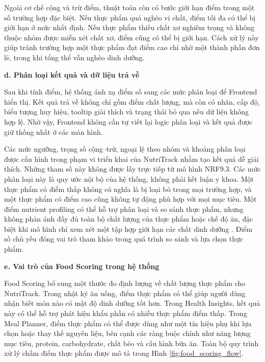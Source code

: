 \documentclass[12pt, a4paper]{report}
\begin{document}
Ngoài cơ chế cộng và trừ điểm, thuật toán còn có bước giới hạn điểm trong một số trường hợp đặc biệt. Nếu thực phẩm quá nghèo vi chất, điểm tối đa có thể bị giới hạn ở mức nhất định. Nếu thực phẩm thiếu chất xơ nghiêm trọng và không thuộc nhóm được miễn xét chất xơ, điểm cũng có thể bị giới hạn. Cách xử lý này giúp tránh trường hợp một thực phẩm đạt điểm cao chỉ nhờ một thành phần đơn lẻ, trong khi tổng thể vẫn nghèo dinh dưỡng.

\textbf{d. Phân loại kết quả và dữ liệu trả về}

Sau khi tính điểm, hệ thống ánh xạ điểm số sang các mức phân loại để Frontend hiển thị. Kết quả trả về không chỉ gồm điểm chất lượng, mà còn có nhãn, cấp độ, biểu tượng huy hiệu, tooltip giải thích và trạng thái bỏ qua nếu dữ liệu không hợp lệ. Nhờ vậy, Frontend không cần tự viết lại logic phân loại và kết quả được giữ thống nhất ở các màn hình.



Các mức ngưỡng, trọng số cộng–trừ, ngoại lệ theo nhóm và khoảng phân loại được cấu hình trong phạm vi triển khai của NutriTrack nhằm tạo kết quả dễ giải thích. Những tham số này không được lấy trực tiếp từ mô hình NRF9.3. Các mức phân loại này là quy ước nội bộ của hệ thống, không phải kết luận y khoa. Một thực phẩm có điểm thấp không có nghĩa là bị loại bỏ trong mọi trường hợp, và một thực phẩm có điểm cao cũng không tự động phù hợp với mọi mục tiêu. Một điểm nutrient profiling có thể hỗ trợ phân loại và so sánh thực phẩm, nhưng không phản ánh đầy đủ toàn bộ chất lượng của thực phẩm hoặc chế độ ăn, đặc biệt khi mô hình chỉ xem xét một tập hợp giới hạn các chất dinh dưỡng \cite{drewnowski2019}. Điểm số chủ yếu đóng vai trò tham khảo trong quá trình so sánh và lựa chọn thực phẩm.

\textbf{e. Vai trò của Food Scoring trong hệ thống}

Food Scoring bổ sung một thước đo định lượng về chất lượng thực phẩm cho NutriTrack. Trong nhật ký ăn uống, điểm thực phẩm có thể giúp người dùng nhận biết món nào có mật độ dinh dưỡng tốt hơn. Trong Health Insights, kết quả này có thể hỗ trợ phát hiện khẩu phần có nhiều thực phẩm điểm thấp. Trong Meal Planner, điểm thực phẩm có thể được dùng như một tín hiệu phụ khi lựa chọn hoặc thay thế nguyên liệu, bên cạnh các ràng buộc chính như năng lượng mục tiêu, protein, carbohydrate, chất béo và cấu hình bữa ăn. Toàn bộ quy trình xử lý chấm điểm thực phẩm được mô tả trong Hình \ref{fig:food_scoring_flow}.
\end{document}
